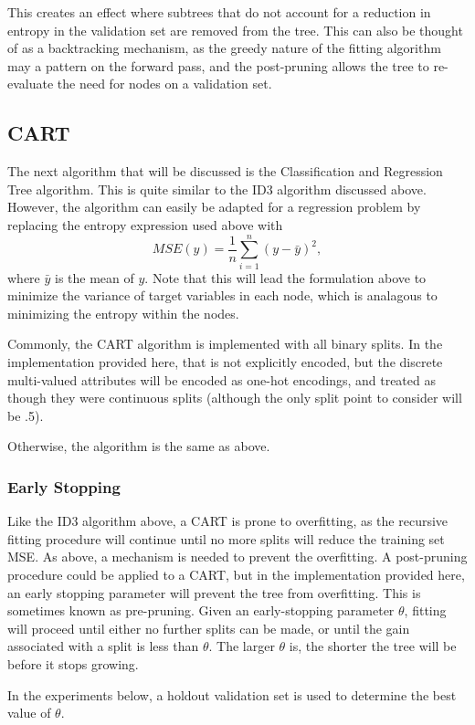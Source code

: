 \documentclass{amsart}
\begin{document}
    This creates an effect where subtrees that do not account for a reduction in entropy in the validation set are
    removed from the tree. This can also be thought of as a backtracking mechanism, as the greedy nature
    of the fitting algorithm may a pattern on the forward pass, and the post-pruning allows the tree to
    re-evaluate the need for nodes on a validation set.

    \subsection{CART}
    The next algorithm that will be discussed is the Classification and Regression Tree algorithm\cite{cart}.
    This is quite similar to the ID3 algorithm discussed above. However, the algorithm
    can easily be adapted for a regression problem by replacing the entropy expression
    used above with
    \[
        MSE(y) = \frac{1}{n} \sum_{i=1}^n (y - \bar{y})^2,
    \]
    where $\bar{y}$ is the mean of $y$. Note that this will lead the formulation above
    to minimize the variance of target variables in each node, which is analagous
    to minimizing the entropy within the nodes.

    Commonly, the CART algorithm is implemented with all binary splits. In the implementation
    provided here, that is not explicitly encoded, but the discrete multi-valued
    attributes will be encoded as one-hot encodings, and treated as though they
    were continuous splits (although the only split point to consider will be .5).

    Otherwise, the algorithm is the same as above.

    \subsubsection{Early Stopping}
    Like the ID3 algorithm above, a CART is prone to overfitting, as the recursive fitting
    procedure will continue until no more splits will reduce the training set MSE.
    As above, a mechanism is needed to prevent the overfitting. A post-pruning
    procedure could be applied to a CART, but in the implementation provided here,
    an early stopping parameter will prevent the tree from overfitting. This is sometimes
    known as pre-pruning\cite{textbook}. Given an early-stopping parameter
    $\theta$, fitting will proceed until either no further splits can be made,
    or until the gain associated with a split is less than $\theta$. The
    larger $\theta$ is, the shorter the tree will be before it stops growing.

    In the experiments below, a holdout validation set is used to determine
    the best value of $\theta$.
\end{document}

